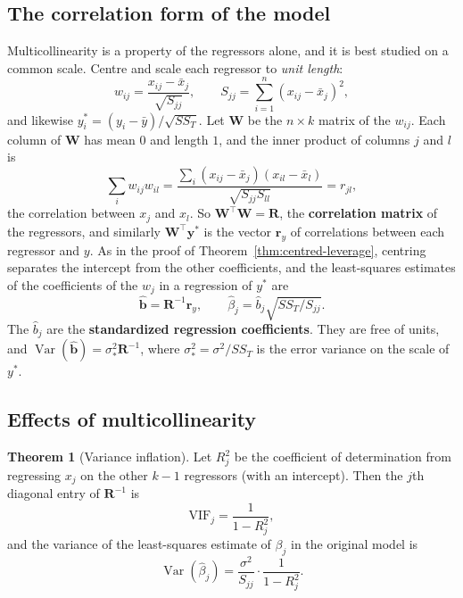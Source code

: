 \documentclass[11pt,a4paper]{article}
\numberwithin{equation}{section}
\theoremstyle{definition}
\newtheorem{thm}{Theorem}[subsection]
\begin{document}
\subsection{The correlation form of the model}
Multicollinearity is a property of the regressors alone, and it is best studied on a common scale.
Centre and scale each regressor to \emph{unit length}:
\[
w_{ij} = \frac{x_{ij} - \bar x_j}{\sqrt{S_{jj}}} , \qquad S_{jj} = \sum_{i=1}^n (x_{ij} - \bar x_j)^2 ,
\]
and likewise $y_i^* = (y_i - \bar y)/\sqrt{SS_T}$. Let $\mathbf{W}$ be the $n \times k$ matrix of the
$w_{ij}$. Each column of $\mathbf{W}$ has mean $0$ and length $1$, and the inner product of columns
$j$ and $l$ is
\[
\sum_i w_{ij}w_{il} = \frac{\sum_i (x_{ij} - \bar x_j)(x_{il} - \bar x_l)}{\sqrt{S_{jj}S_{ll}}} = r_{jl} ,
\]
the correlation between $x_j$ and $x_l$. So $\mathbf{W}^\top\mathbf{W} = \mathbf{R}$, the
\textbf{correlation matrix} of the regressors, and similarly $\mathbf{W}^\top\mathbf{y}^*$ is the vector
$\mathbf{r}_y$ of correlations between each regressor and $y$. As in the proof of
Theorem~\ref{thm:centred-leverage}, centring separates the intercept from the other coefficients,
and the least-squares estimates of the coefficients of the $w_j$ in a regression of $y^*$ are
\[
\hat{\mathbf{b}} = \mathbf{R}^{-1}\mathbf{r}_y , \qquad \hat\beta_j = \hat b_j\sqrt{SS_T/S_{jj}} .
\]
The $\hat b_j$ are the \textbf{standardized regression coefficients}. They are free of units, and
$\operatorname{Var}(\hat{\mathbf{b}}) = \sigma_*^2\mathbf{R}^{-1}$, where $\sigma_*^2 = \sigma^2/SS_T$ is the error
variance on the scale of $y^*$.

\subsection{Effects of multicollinearity}
\begin{thm}[Variance inflation]\label{thm:vif}
Let $R_j^2$ be the coefficient of determination from regressing $x_j$ on the other $k - 1$
regressors (with an intercept). Then the $j$th diagonal entry of $\mathbf{R}^{-1}$ is
\[
\mathrm{VIF}_j = \frac{1}{1 - R_j^2} ,
\]
and the variance of the least-squares estimate of $\beta_j$ in the original model is
\[
\operatorname{Var}(\hat\beta_j) = \frac{\sigma^2}{S_{jj}}\cdot\frac{1}{1 - R_j^2} .
\]
\end{thm}
\end{document}
